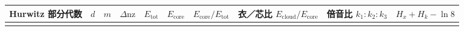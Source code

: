 \documentclass[
  a4paper,
]{ltjsarticle}
\newcounter{none} %
\begin{document}
{\def\LTcaptype{none} %
\begin{longtable}[]{@{}
  >{\raggedright\arraybackslash}p{}
  >{\centering\arraybackslash}p{}
  >{\centering\arraybackslash}p{}
  >{\centering\arraybackslash}p{}
  >{\centering\arraybackslash}p{}
  >{\centering\arraybackslash}p{}
  >{\centering\arraybackslash}p{}
  >{\centering\arraybackslash}p{}
  >{\centering\arraybackslash}p{}
  >{\centering\arraybackslash}p{}@{}}
\toprule\noalign{}
\begin{minipage}[b]{\linewidth}\raggedright
Hurwitz 部分代数
\end{minipage} & \begin{minipage}[b]{\linewidth}\centering
\(d\)
\end{minipage} & \begin{minipage}[b]{\linewidth}\centering
\(m\)
\end{minipage} & \begin{minipage}[b]{\linewidth}\centering
\(\Delta\mathrm{nz}\)
\end{minipage} & \begin{minipage}[b]{\linewidth}\centering
\(E_{\mathrm{tot}}\)
\end{minipage} & \begin{minipage}[b]{\linewidth}\centering
\(E_{\mathrm{core}}\)
\end{minipage} & \begin{minipage}[b]{\linewidth}\centering
\(E_{\mathrm{core}}/E_{\mathrm{tot}}\)
\end{minipage} & \begin{minipage}[b]{\linewidth}\centering
\textbf{衣／芯比 \(E_{\mathrm{cloud}}/E_{\mathrm{core}}\)}
\end{minipage} & \begin{minipage}[b]{\linewidth}\centering
\textbf{倍音比 \(k_1:k_2:k_3\)}
\end{minipage} & \begin{minipage}[b]{\linewidth}\centering
\(H_x+H_k-\ln 8\)
\end{minipage} \\
\midrule\noalign{}

\end{longtable}}
\end{document}
